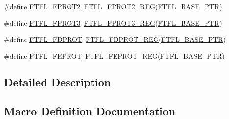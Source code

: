\begin{DoxyCompactItemize}
\item 
\#define \hyperlink{group___f_t_f_l___register___accessor___macros_gad1419b6c37f5984c3ef3a96d5f7d9ede}{F\+T\+F\+L\+\_\+\+F\+P\+R\+O\+T2}~\hyperlink{group___f_t_f_l___register___accessor___macros_ga3d2ae39f0e6774e167ee98627f68dd7a}{F\+T\+F\+L\+\_\+\+F\+P\+R\+O\+T2\+\_\+\+R\+EG}(\hyperlink{group___f_t_f_l___peripheral_gad2bcbae914ba8547b96791479afda939}{F\+T\+F\+L\+\_\+\+B\+A\+S\+E\+\_\+\+P\+TR})
\item 
\#define \hyperlink{group___f_t_f_l___register___accessor___macros_gaf85e01513a3b3f71d79ea3dea9e6eb77}{F\+T\+F\+L\+\_\+\+F\+P\+R\+O\+T3}~\hyperlink{group___f_t_f_l___register___accessor___macros_ga3e7662648ae40179bc1b22849a460b6a}{F\+T\+F\+L\+\_\+\+F\+P\+R\+O\+T3\+\_\+\+R\+EG}(\hyperlink{group___f_t_f_l___peripheral_gad2bcbae914ba8547b96791479afda939}{F\+T\+F\+L\+\_\+\+B\+A\+S\+E\+\_\+\+P\+TR})
\item 
\#define \hyperlink{group___f_t_f_l___register___accessor___macros_ga5b38f7e47a2bc9e993186fa47012aef6}{F\+T\+F\+L\+\_\+\+F\+D\+P\+R\+OT}~\hyperlink{group___f_t_f_l___register___accessor___macros_ga317742f25d2e4ee9faa22f74f930ef61}{F\+T\+F\+L\+\_\+\+F\+D\+P\+R\+O\+T\+\_\+\+R\+EG}(\hyperlink{group___f_t_f_l___peripheral_gad2bcbae914ba8547b96791479afda939}{F\+T\+F\+L\+\_\+\+B\+A\+S\+E\+\_\+\+P\+TR})
\item 
\#define \hyperlink{group___f_t_f_l___register___accessor___macros_gad1f5e5aa570a2787b3d4dc838fe932dc}{F\+T\+F\+L\+\_\+\+F\+E\+P\+R\+OT}~\hyperlink{group___f_t_f_l___register___accessor___macros_ga35c7eb7ca866e4e5743e81f5a523e402}{F\+T\+F\+L\+\_\+\+F\+E\+P\+R\+O\+T\+\_\+\+R\+EG}(\hyperlink{group___f_t_f_l___peripheral_gad2bcbae914ba8547b96791479afda939}{F\+T\+F\+L\+\_\+\+B\+A\+S\+E\+\_\+\+P\+TR})
\end{DoxyCompactItemize}


\subsection{Detailed Description}


\subsection{Macro Definition Documentation}
